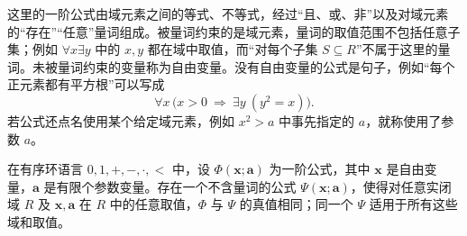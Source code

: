 \ProseParagraphBreak
这里的一阶公式由域元素之间的等式、不等式，经过“且、或、非”以及对域元素的“存在”“任意”量词组成。被量词约束的是域元素，量词的取值范围不包括任意子集；例如 \(\forall x\exists y\) 中的 \(x,y\) 都在域中取值，而“对每个子集 \(S\subseteq R\)”不属于这里的量词。未被量词约束的变量称为自由变量。没有自由变量的公式是句子，例如“每个正元素都有平方根”可以写成
\[
	\forall x\,\bigl(x>0\ \Longrightarrow\ \exists y\ (y^2=x)\bigr).
\]
若公式还点名使用某个给定域元素，例如 \(x^2>a\) 中事先指定的 \(a\)，就称使用了参数 \(a\)。

\begin{theorem}[实闭域的量词消去]\label{b1:thm:E-quantifier-elimination}
	在有序环语言 \(0,1,+,-,\cdot,<\) 中，设 \(\Phi(\mathbf{x};\mathbf{a})\) 为一阶公式，其中 \(\mathbf{x}\) 是自由变量，\(\mathbf{a}\) 是有限个参数变量。存在一个不含量词的公式 \(\Psi(\mathbf{x};\mathbf{a})\)，使得对任意实闭域 \(R\) 及 \(\mathbf{x},\mathbf{a}\) 在 \(R\) 中的任意取值，\(\Phi\) 与 \(\Psi\) 的真值相同；同一个 \(\Psi\) 适用于所有这些域和取值。
\end{theorem}
